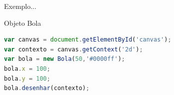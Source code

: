 \documentclass[xcolor=dvipsnames,table]{beamer}
\begin{document}
\begin{frame}[fragile]{Exemplo...}
	\begin{block}{Objeto Bola}
		\begin{lstlisting}[language=JavaScript]
var canvas = document.getElementById('canvas');
var contexto = canvas.getContext('2d');
var bola = new Bola(50,'#0000ff');
bola.x = 100;
bola.y = 100;
bola.desenhar(contexto);
\end{lstlisting}	
	\end{block}
\end{frame}

	
	\begin{frame}
		\titlepage
	\end{frame}
	
\end{document}
